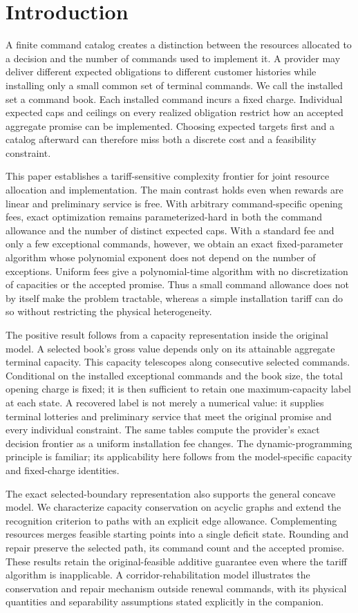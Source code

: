 \documentclass[11pt,letterpaper]{article}
\theoremstyle{definition}\newtheorem{remark}[theorem]{Remark}
\begin{document}
\section{Introduction}
A finite command catalog creates a distinction between the resources allocated to a decision and the number of commands used to implement it. A provider may deliver different expected obligations to different customer histories while installing only a small common set of terminal commands. We call the installed set a command book. Each installed command incurs a fixed charge. Individual expected caps and ceilings on every realized obligation restrict how an accepted aggregate promise can be implemented. Choosing expected targets first and a catalog afterward can therefore miss both a discrete cost and a feasibility constraint.

This paper establishes a tariff-sensitive complexity frontier for joint resource allocation and implementation. The main contrast holds even when rewards are linear and preliminary service is free. With arbitrary command-specific opening fees, exact optimization remains parameterized-hard in both the command allowance and the number of distinct expected caps. With a standard fee and only a few exceptional commands, however, we obtain an exact fixed-parameter algorithm whose polynomial exponent does not depend on the number of exceptions. Uniform fees give a polynomial-time algorithm with no discretization of capacities or the accepted promise. Thus a small command allowance does not by itself make the problem tractable, whereas a simple installation tariff can do so without restricting the physical heterogeneity.

The positive result follows from a capacity representation inside the original model. A selected book's gross value depends only on its attainable aggregate terminal capacity. This capacity telescopes along consecutive selected commands. Conditional on the installed exceptional commands and the book size, the total opening charge is fixed; it is then sufficient to retain one maximum-capacity label at each state. A recovered label is not merely a numerical value: it supplies terminal lotteries and preliminary service that meet the original promise and every individual constraint. The same tables compute the provider's exact decision frontier as a uniform installation fee changes. The dynamic-programming principle is familiar; its applicability here follows from the model-specific capacity and fixed-charge identities.

The exact selected-boundary representation also supports the general concave model. We characterize capacity conservation on acyclic graphs and extend the recognition criterion to paths with an explicit edge allowance. Complementing resources merges feasible starting points into a single deficit state. Rounding and repair preserve the selected path, its command count and the accepted promise. These results retain the original-feasible additive guarantee even where the tariff algorithm is inapplicable. A corridor-rehabilitation model illustrates the conservation and repair mechanism outside renewal commands, with its physical quantities and separability assumptions stated explicitly in the companion.
\end{document}
